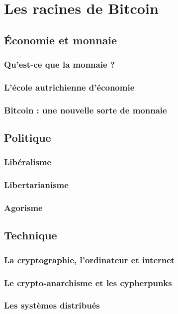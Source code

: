 \chapter{Les racines de  Bitcoin}

\section{Économie et monnaie}

\subsection{Qu'est-ce que la monnaie ?}

\subsection{L'école autrichienne d'économie}

\subsection{Bitcoin : une nouvelle sorte de monnaie}

\section{Politique}

\subsection{Libéralisme}

\subsection{Libertarianisme}

\subsection{Agorisme}

\section{Technique}

\subsection{La cryptographie, l'ordinateur et internet}

\subsection{Le crypto-anarchisme et les cypherpunks}

\subsection{Les systèmes distribués}